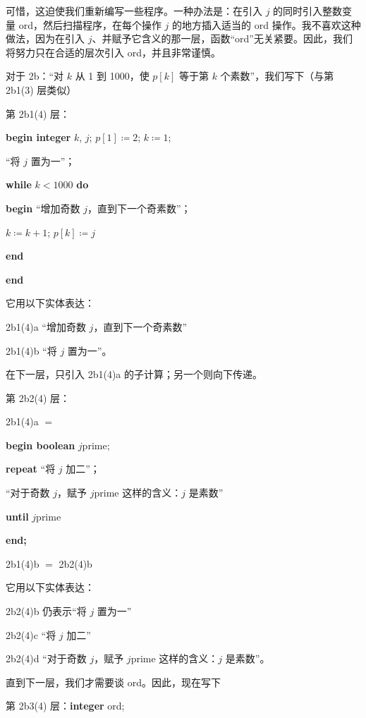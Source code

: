 \documentclass[twoside,11pt,fontset=none]{ctexbook}
\begin{document}
可惜，这迫使我们重新编写一些程序。一种办法是：在引入 $j$ 的同时引入整数变量 ord，然后扫描程序，在每个操作 $j$ 的地方插入适当的 ord 操作。我不喜欢这种做法，因为在引入 $j$、并赋予它含义的那一层，函数“ord”无关紧要。因此，我们将努力只在合适的层次引入 ord，并且非常谨慎。

对于 2b：“对 $k$ 从 1 到 1000，使 $p[k]$ 等于第 $k$ 个素数”，我们写下（与第 2b1(3) 层类似）

\noindent
第 2b1(4) 层：

\noindent
\textbf{begin integer} $k$, $j$; $p[1] \coloneq 2$; $k \coloneq 1$;

\noindent
\quad “将 $j$ 置为一”；

\noindent
\quad\textbf{while} $k < 1000$ \textbf{do}

\noindent
\quad\textbf{begin} “增加奇数 $j$，直到下一个奇素数”；

\noindent
\quad\quad $k \coloneq k + 1$; $p[k] \coloneq j$

\noindent
\quad\textbf{end}

\noindent
\textbf{end}

\noindent
它用以下实体表达：

\noindent
2b1(4)a\tabto{5em} “增加奇数 $j$，直到下一个奇素数”

\noindent
2b1(4)b\tabto{5em} “将 $j$ 置为一”。

在下一层，只引入 2b1(4)a 的子计算；另一个则向下传递。

\noindent
第 2b2(4) 层：

\noindent
2b1(4)a $=$

\noindent
\textbf{begin boolean} $j$prime;

\noindent
\quad\textbf{repeat} “将 $j$ 加二”；

\noindent
\quad\quad “对于奇数 $j$，赋予 $j$prime 这样的含义：$j$ 是素数”

\noindent
\quad\textbf{until} $j$prime

\noindent
\textbf{end;}

\noindent
2b1(4)b $=$ 2b2(4)b

\noindent
它用以下实体表达：

\noindent
2b2(4)b\tabto{5em} 仍表示“将 $j$ 置为一”

\noindent
2b2(4)c\tabto{5em} “将 $j$ 加二”

\noindent
2b2(4)d\tabto{5em} “对于奇数 $j$，赋予 $j$prime 这样的含义：$j$ 是素数”。

直到下一层，我们才需要谈 ord。因此，现在写下

\noindent
第 2b3(4) 层：\textbf{integer} ord;
\end{document}

